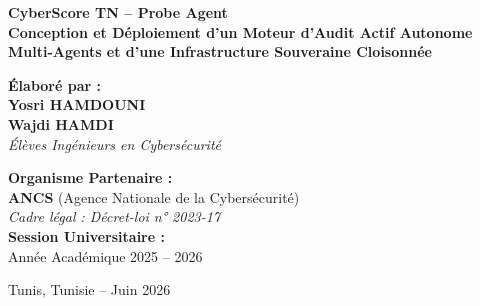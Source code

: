 \documentclass[11pt,a4paper,oneside]{article}
\begin{document}
\begin{titlepage}
\begin{center}
\vspace{0.8cm}

\begin{tcolorbox}[
    colback=white,
    colframe=tekupPurple,
    arc=1mm,
    boxrule=1.5pt,
    left=12pt,
    right=12pt,
    top=9pt,
    bottom=9pt
]
    \centering
    {\huge \bfseries \color{tekupPurple} CyberScore TN -- Probe Agent}\\[2.5mm]
    {\large \textbf{Conception et Déploiement d'un Moteur d'Audit Actif Autonome Multi-Agents et d'une Infrastructure Souveraine Cloisonnée}}
\end{tcolorbox}

\vspace{0.9cm}

\begin{minipage}[t]{0.48\textwidth}
    \flushleft
    \textbf{Élaboré par :}\\[2mm]
    {\large \textbf{Yosri HAMDOUNI}}\\[1mm]
    {\large \textbf{Wajdi HAMDI}}\\[2.5mm]
    \footnotesize \textit{Élèves Ingénieurs en Cybersécurité}
\end{minipage}
\hfill
\begin{minipage}[t]{0.48\textwidth}
    \flushleft
    \textbf{Organisme Partenaire :}\\[2mm]
    {\textbf{ANCS} (Agence Nationale de la Cybersécurité)}\\[1.5mm]
    \footnotesize \textit{Cadre légal : Décret-loi n° 2023-17}\\[2mm]
    \textbf{Session Universitaire :}\\[1mm]
    {\small Année Académique 2025 -- 2026}
\end{minipage}

\vfill

{\footnotesize Tunis, Tunisie -- Juin 2026}

\end{center}
\end{titlepage}

\tableofcontents
\newpage

\end{document}

